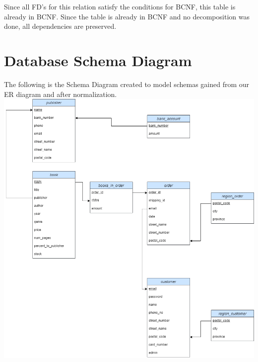 \documentclass[a4 paper]{article}
\begin{document}
\noindent Since all FD's for this relation satisfy the conditions for BCNF, this table is already in BCNF. Since the table is already in BCNF and no decomposition was done, all dependencies are preserved.\\

\section{Database Schema Diagram}

The following is the Schema Diagram created to model schemas gained from our ER diagram and after normalization.\\

\includegraphics[scale=0.5]{../Diagrams/Schema-diagram-comp3005-finalproject.drawio.png}\\
\end{document}
